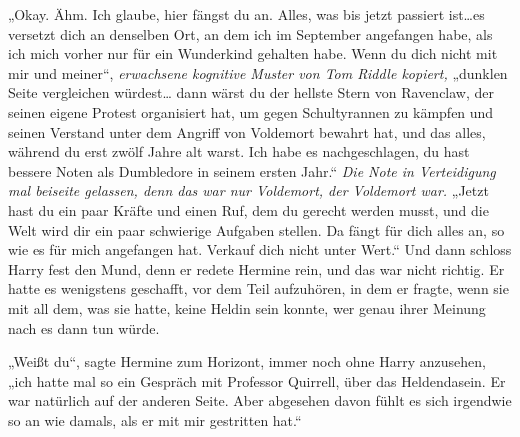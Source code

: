 „Okay. Ähm. Ich glaube, hier fängst du an. Alles, was bis jetzt passiert ist…es versetzt dich an denselben Ort, an dem ich im September angefangen habe, als ich mich vorher nur für ein Wunderkind gehalten habe. Wenn du dich nicht mit mir und meiner“, \emph{erwachsene kognitive Muster von Tom Riddle kopiert,} „dunklen Seite vergleichen würdest… dann wärst du der hellste Stern von Ravenclaw, der seinen eigene Protest organisiert hat, um gegen Schultyrannen zu kämpfen und seinen Verstand unter dem Angriff von Voldemort bewahrt hat, und das alles, während du erst zwölf Jahre alt warst. Ich habe es nachgeschlagen, du hast bessere Noten als Dumbledore in seinem ersten Jahr.“ \emph{Die Note in Verteidigung mal beiseite gelassen, denn das war nur Voldemort, der Voldemort war.} „Jetzt hast du ein paar Kräfte und einen Ruf, dem du gerecht werden musst, und die Welt wird dir ein paar schwierige Aufgaben stellen. Da fängt für dich alles an, so wie es für mich angefangen hat. Verkauf dich nicht unter Wert.“ Und dann schloss Harry fest den Mund, denn er redete Hermine rein, und das war nicht richtig.
Er hatte es wenigstens geschafft, vor dem Teil aufzuhören, in dem er fragte, wenn sie mit all dem, was sie hatte, keine Heldin sein konnte, wer genau ihrer Meinung nach es dann tun würde.

„Weißt du“, sagte Hermine zum Horizont, immer noch ohne Harry anzusehen, „ich hatte mal so ein Gespräch mit Professor Quirrell, über das Heldendasein. Er war natürlich auf der anderen Seite. Aber abgesehen davon fühlt es sich irgendwie so an wie damals, als er mit mir gestritten hat.“

